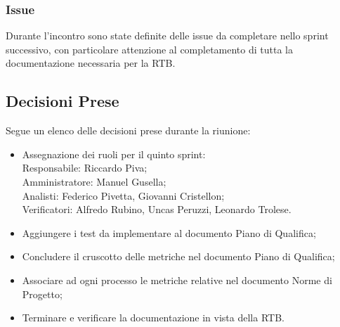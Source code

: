 \documentclass[10pt]{article}
\begin{document}
\subsubsection{Issue}
Durante l'incontro sono state definite delle issue da completare nello sprint successivo, con particolare attenzione al completamento
di tutta la documentazione necessaria per la RTB.

\subsection{Decisioni Prese}
Segue un elenco delle decisioni prese durante la riunione:
\begin{itemize}
    \item   Assegnazione dei ruoli per il quinto sprint:\\
            Responsabile: Riccardo Piva;\\
            Amministratore: Manuel Gusella;\\
            Analisti: Federico Pivetta, Giovanni Cristellon;\\
            Verificatori: Alfredo Rubino, Uncas Peruzzi, Leonardo Trolese.\\
    \item Aggiungere i test da implementare al documento Piano di Qualifica;
    \item Concludere il cruscotto delle metriche nel documento Piano di Qualifica;
    \item Associare ad ogni processo le metriche relative nel documento Norme di Progetto;
    \item Terminare e verificare la documentazione in vista della RTB.
\end{itemize}
\end{document}
